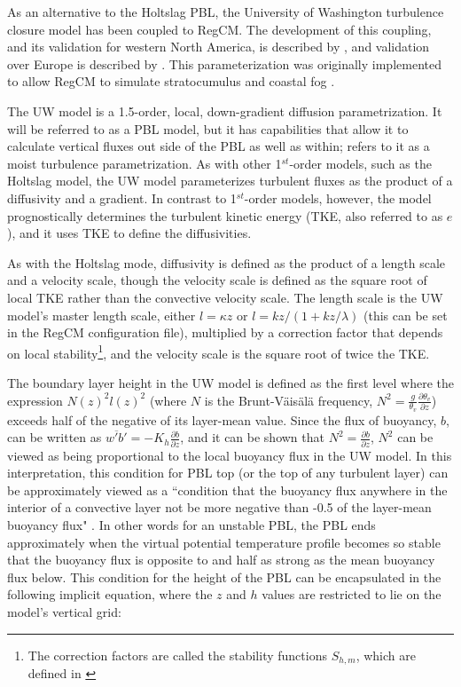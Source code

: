 As an alternative to the Holtslag PBL, the University of Washington turbulence
closure model \citep{Grenier_01,Bretherton_04} has been coupled to RegCM.  The
development of this coupling, and its validation for western North America, is
described by \cite{OBrien_12a}, and validation over Europe is described by
\cite{Guettler_13}.  This parameterization was originally implemented to allow
RegCM to simulate stratocumulus and coastal fog
\citep{OBrien_12a,OBrien_12b}.

The UW model is a 1.5-order, local, down-gradient diffusion parametrization.
It will be referred to as a PBL model, but it has capabilities that allow it to
calculate vertical fluxes out side of the PBL as well as within;
\cite{Bretherton_04} refers to it as a moist turbulence parametrization.  As
with other 1$^{st}$-order models, such as the Holtslag model, the UW model
parameterizes turbulent fluxes as the product of a diffusivity and a gradient.
In contrast to 1$^{st}$-order models, however, the model prognostically
determines the turbulent kinetic energy (TKE, also referred to as $e$), and it
uses TKE to define the diffusivities. 

As with the Holtslag mode, diffusivity is defined as the product of a length
scale and a velocity scale, though the velocity scale is defined as the square
root of local TKE rather than the convective velocity scale. The length scale
is the UW model's master length scale, either $l = \kappa z$ or $l = kz/(1 +
kz/\lambda)$ (this can be set in the RegCM configuration file), multiplied by a
correction factor that depends on local stability\footnote{The correction
  factors are called the stability functions $S_{h,m}$, which are defined in
\cite{Galperin_88}}, and the velocity scale is the square root of twice the
TKE.

The boundary layer height in the UW model is defined as the first level where
the expression $N(z)^2 l(z)^2$ (where $N$ is the Brunt-V\"{a}is\"{a}l\"{a}
frequency, $N^2 = \frac{g}{\theta_v}\frac{\partial \theta_v}{\partial z}$)
exceeds half of the negative of its layer-mean value.  Since the flux of
buoyancy, $b$, can be written as $\overline{w'b'} = -K_h \frac{\partial
b}{\partial z}$, and it can be shown that $N^2 = \frac{\partial b}{\partial
z}$, $N^2$ can be viewed as being proportional to the local buoyancy flux in
the UW model.  In this interpretation, this condition for PBL top (or the top
of any turbulent layer) can be approximately viewed as a ``condition that the
buoyancy flux anywhere in the interior of a convective layer not be more
negative than -0.5 of the layer-mean buoyancy flux" \citep{Bretherton_04}.  In
other words for an unstable PBL, the PBL ends approximately when the virtual
potential temperature profile becomes so stable that the buoyancy flux is
opposite to and half as strong as the mean buoyancy flux below.  This condition
for the height of the PBL can be encapsulated in the following implicit
equation, where the $z$ and $h$ values are restricted to lie on the model's
vertical grid:

